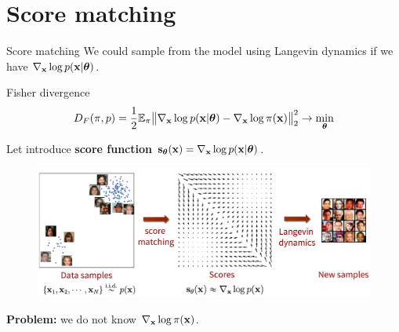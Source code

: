 \section{Score matching}
\begin{frame}{Score matching}
	We could sample from the model using Langevin dynamics if we have $\nabla_{\mathbf{x}}\log p(\mathbf{x}| \boldsymbol{\theta})$.
	\begin{block}{Fisher divergence}
		\vspace{-0.3cm}
		\[
		D_F(\pi, p) = \frac{1}{2}\mathbb{E}_{\pi}\bigl\| \nabla_{\mathbf{x}}\log p(\mathbf{x}| \boldsymbol{\theta}) - \nabla_{\mathbf{x}} \log \pi(\mathbf{x}) \bigr\|^2_2 \rightarrow \min_{\boldsymbol{\theta}}
		\]
		\vspace{-0.5cm}
	\end{block}
	Let introduce \textbf{score function} $\mathbf{s}_{\boldsymbol{\theta}}(\mathbf{x}) = \nabla_{\mathbf{x}}\log p(\mathbf{x}| \boldsymbol{\theta})$. 
	\vspace{-0.2cm}
	\begin{figure}
		\centering
		\includegraphics[width=0.75\linewidth]{figs/smld}
	\end{figure}
	\vspace{-0.3cm} 
	\textbf{Problem:} we do not know $\nabla_{\mathbf{x}} \log \pi(\mathbf{x})$.
\end{frame}
